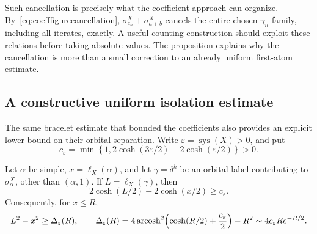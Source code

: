 Such cancellation is precisely what the coefficient approach can
organize. By~\eqref{eq:coefffigurecancellation},
$\sigma_{c_n}^X+\sigma_{a+b}^X$ cancels the entire chosen
$\gamma_n$ family, including all iterates, exactly. A useful
counting construction should exploit these relations before taking
absolute values. The proposition explains why the cancellation is
more than a small correction to an already uniform first-atom
estimate.

\subsection{A constructive uniform isolation estimate}
\label{subsec:countuniformisolation}

The same bracelet estimate that bounded the coefficients also
provides an explicit lower bound on their orbital separation.
Write $\varepsilon=\operatorname{sys}(X)>0$, and put
\begin{equation}
 c_\varepsilon=\min\left\{1,
       2\cosh(3\varepsilon/2)-2\cosh(\varepsilon/2)\right\}>0.
 \label{eq:counttracegapconstant}
\end{equation}

\begin{lemma}
\label{lem:counttracegap}
Let $\alpha$ be simple, $x=\ell_X(\alpha)$, and let
$\gamma=\delta^k$ be an orbital label contributing to
$\sigma_\alpha^X$, other than $(\alpha,1)$. If $L=\ell_X(\gamma)$,
then
\begin{equation}
 2\cosh(L/2)-2\cosh(x/2)\geq c_\varepsilon.
 \label{eq:counttracegap}
\end{equation}
Consequently, for $x\leq R$,
\begin{equation}
 L^2-x^2\geq\Delta_\varepsilon(R),\qquad
 \Delta_\varepsilon(R)=
 4\operatorname{arcosh}^2\!\left(\cosh(R/2)+\frac{c_\varepsilon}{2}\right)-R^2
 \sim4c_\varepsilon R e^{-R/2}.
 \label{eq:countactiongap}
\end{equation}
\end{lemma}

